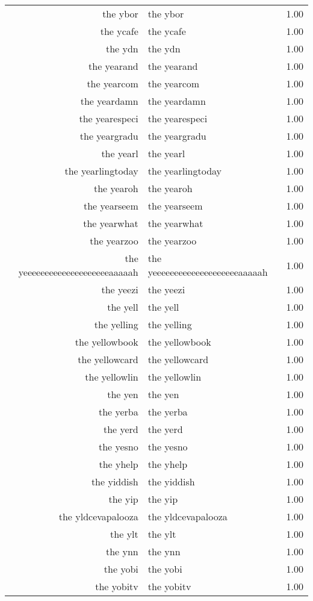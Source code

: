 \begin{table}[ht]
\begin{tabular}{rlr}
  the ybor & the ybor & 1.00 \\ 
  the ycafe & the ycafe & 1.00 \\ 
  the ydn & the ydn & 1.00 \\ 
  the yearand & the yearand & 1.00 \\ 
  the yearcom & the yearcom & 1.00 \\ 
  the yeardamn & the yeardamn & 1.00 \\ 
  the yearespeci & the yearespeci & 1.00 \\ 
  the yeargradu & the yeargradu & 1.00 \\ 
  the yearl & the yearl & 1.00 \\ 
  the yearlingtoday & the yearlingtoday & 1.00 \\ 
  the yearoh & the yearoh & 1.00 \\ 
  the yearseem & the yearseem & 1.00 \\ 
  the yearwhat & the yearwhat & 1.00 \\ 
  the yearzoo & the yearzoo & 1.00 \\ 
  the yeeeeeeeeeeeeeeeeeeeeaaaaah & the yeeeeeeeeeeeeeeeeeeeeaaaaah & 1.00 \\ 
  the yeezi & the yeezi & 1.00 \\ 
  the yell & the yell & 1.00 \\ 
  the yelling & the yelling & 1.00 \\ 
  the yellowbook & the yellowbook & 1.00 \\ 
  the yellowcard & the yellowcard & 1.00 \\ 
  the yellowlin & the yellowlin & 1.00 \\ 
  the yen & the yen & 1.00 \\ 
  the yerba & the yerba & 1.00 \\ 
  the yerd & the yerd & 1.00 \\ 
  the yesno & the yesno & 1.00 \\ 
  the yhelp & the yhelp & 1.00 \\ 
  the yiddish & the yiddish & 1.00 \\ 
  the yip & the yip & 1.00 \\ 
  the yldcevapalooza & the yldcevapalooza & 1.00 \\ 
  the ylt & the ylt & 1.00 \\ 
  the ynn & the ynn & 1.00 \\ 
  the yobi & the yobi & 1.00 \\ 
  the yobitv & the yobitv & 1.00 \\ 

\end{tabular}
\end{table}
